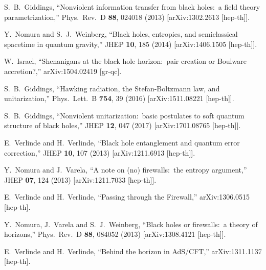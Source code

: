 \documentclass[12pt]{article}
\begin{document}
\begin{thebibliography}{99}
S.~B.~Giddings,
``Nonviolent information transfer from black holes:\ a field theory parametrization,''
Phys.\ Rev.\ D {\bf 88}, 024018 (2013)
[arXiv:1302.2613 [hep-th]].

Y.~Nomura and S.~J.~Weinberg,
``Black holes, entropies, and semiclassical spacetime in quantum gravity,''
JHEP {\bf 10}, 185 (2014)
[arXiv:1406.1505 [hep-th]].

W.~Israel,
``Shenanigans at the black hole horizon:\ pair creation or Boulware accretion?,''
arXiv:1504.02419 [gr-qc].

S.~B.~Giddings,
``Hawking radiation, the Stefan-Boltzmann law, and unitarization,''
Phys.\ Lett.\ B {\bf 754}, 39 (2016)
[arXiv:1511.08221 [hep-th]].

S.~B.~Giddings,
``Nonviolent unitarization:\ basic postulates to soft quantum structure of black holes,''
JHEP {\bf 12}, 047 (2017)
[arXiv:1701.08765 [hep-th]].

E.~Verlinde and H.~Verlinde,
``Black hole entanglement and quantum error correction,''
JHEP {\bf 10}, 107 (2013)
[arXiv:1211.6913 [hep-th]].

Y.~Nomura and J.~Varela,
``A note on (no) firewalls:\ the entropy argument,''
JHEP {\bf 07}, 124 (2013)
[arXiv:1211.7033 [hep-th]].

E.~Verlinde and H.~Verlinde,
``Passing through the Firewall,''
arXiv:1306.0515 [hep-th].

Y.~Nomura, J.~Varela and S.~J.~Weinberg,
``Black holes or firewalls:\ a theory of horizons,''
Phys.\ Rev.\ D {\bf 88}, 084052 (2013)
[arXiv:1308.4121 [hep-th]].

E.~Verlinde and H.~Verlinde,
``Behind the horizon in AdS/CFT,''
arXiv:1311.1137 [hep-th].


\end{thebibliography}
\end{document}
